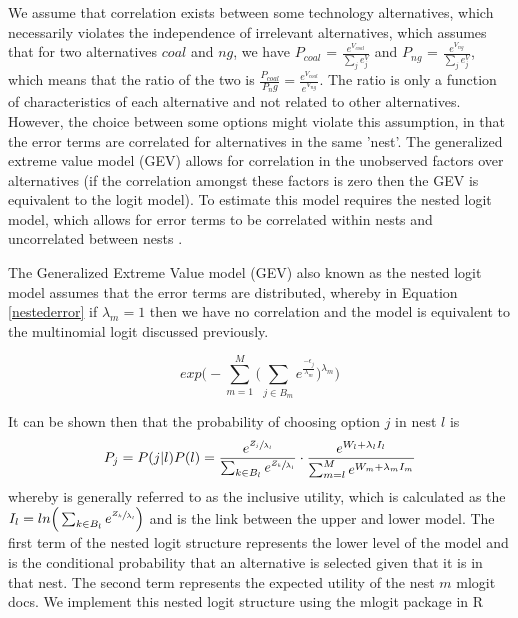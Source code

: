 \documentclass[10pt]{amsart}
\begin{document}
We assume that correlation exists between some technology alternatives, which necessarily violates the independence of irrelevant alternatives, which assumes that for two alternatives $coal$ and $ng$, we have $P_{coal}$ = $\frac{e^{V_{coal}}}{\sum_j e^V_j}$ and $P_{ng}$ = $\frac{e^{V_{ng}}}{\sum_j e^V_j}$, which means that the ratio of the two is $\frac{P_{coal}}{P_ng} = \frac{e^{V_{coal}}}{e^{V_{ng}}}$.
The ratio is only a function of characteristics of each alternative and not related to other alternatives. 
However, the choice between some options might violate this assumption, in that the error terms are correlated for alternatives in the same 'nest'.  
The generalized extreme value model (GEV) allows for correlation in the unobserved factors over alternatives (if the correlation amongst these factors is zero then the GEV is equivalent to the logit model). 
To estimate this model requires the nested logit model, which allows for error terms to be correlated within nests and uncorrelated between nests \parencite{mcfadden1978}.

The Generalized Extreme Value model (GEV) also known as the nested logit model assumes that the error terms are distributed, whereby in Equation \ref{nestederror} if $\lambda_m = 1$ then we have no correlation and the model is equivalent to the multinomial logit discussed previously. 

\begin{equation}\label{nestederror}
exp\Big(- \sum_{m=1}^{M} \Big(\sum_{j\in B_m} e^{\frac{-\epsilon_j}{\lambda_m}} \Big)^{\lambda_m} \Big)
\end{equation} 

It can be shown then that the probability of choosing option $j$ in nest $l$ is 
\begin{equation}
P_j = P(j | l)P(l) = \frac{e^{\sfrac{{Z_j}}{\lambda_l}}}{\sum_{k\in B_l}e^{\sfrac{Z_k}{\lambda_l}}} \cdot \frac{e^{W_l+\lambda_l I_l}}{\sum_{m=l}^M e^{W_m+\lambda_m I_m}}
\end{equation}
whereby is generally referred to as the inclusive utility, which is calculated as the $I_l = ln\Big(\sum_{k\in B_l} e^{\sfrac{Z_k}{\lambda_l}}\Big)$ and is the link between the upper and lower model. 
The first term of the nested logit structure represents the lower level of the model and is the conditional probability that an alternative is selected given that it is in that nest. 
The second term represents the expected utility of the nest $m$ \parencite{} mlogit docs.
We implement this nested logit structure using the mlogit package in R \parencite{mlogit2013}
\end{document}
